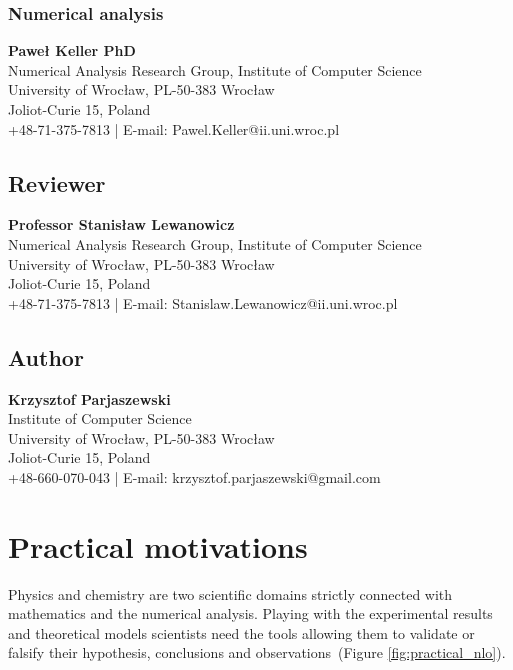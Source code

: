 \documentclass[12pt,twoside,a4paper]{article}
\numberwithin{equation}{subsection}
\numberwithin{figure}{subsection}
\begin{document}
\subsubsection*{Numerical analysis}

\textbf{Paweł Keller PhD} \\
Numerical Analysis Research Group, Institute of Computer Science \\
University of Wrocław, PL-50-383 Wrocław \\
Joliot-Curie 15, Poland \\
+48-71-375-7813 | E-mail: Pawel.Keller@ii.uni.wroc.pl


\subsection*{Reviewer}  \label{chap:abstract_reviewer}

\textbf{Professor Stanisław Lewanowicz} \\
Numerical Analysis Research Group, Institute of Computer Science \\
University of Wrocław, PL-50-383 Wrocław \\
Joliot-Curie 15, Poland \\
+48-71-375-7813 | E-mail: Stanislaw.Lewanowicz@ii.uni.wroc.pl

\subsection*{Author}  \label{chap:abstract_author}

\textbf{Krzysztof Parjaszewski} \\
Institute of Computer Science \\
University of Wrocław, PL-50-383 Wrocław \\
Joliot-Curie 15, Poland \\
+48-660-070-043 | E-mail: krzysztof.parjaszewski@gmail.com

\section{Practical motivations} \label{chap:practical_motivations}
Physics and chemistry are two scientific domains strictly connected with mathematics and the numerical analysis. Playing with the
experimental results and theoretical models scientists need the tools allowing them to validate or falsify their hypothesis, conclusions and
observations~(Figure \ref{fig:practical_nlo}).
\end{document}
